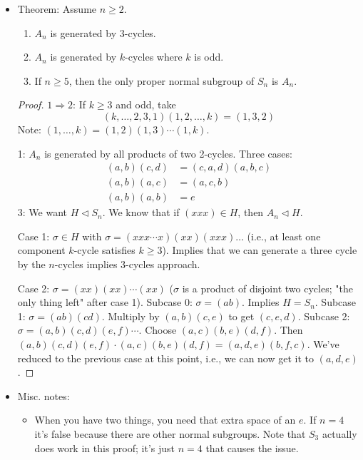 \documentclass[../notes.tex]{subfiles}
\begin{document}
\begin{itemize}
\begin{itemize}
    \end{itemize}
    \item Theorem: Assume $n\geq 2$.
    \begin{enumerate}
        \item $A_n$ is generated by 3-cycles.
        \item $A_n$ is generated by $k$-cycles where $k$ is odd.
        \item If $n\geq 5$, then the only proper normal subgroup of $S_n$ is $A_n$.
    \end{enumerate}
    \begin{proof}
        $1\Rightarrow 2$: If $k\geq 3$ and odd, take
        \begin{equation*}
            (k,\dots,2,3,1)(1,2,\dots,k) = (1,3,2)
        \end{equation*}
        Note: $(1,\dots,k)=(1,2)(1,3)\cdots(1,k)$.\par
        1: $A_n$ is generated by all products of two 2-cycles. Three cases:
        \begin{align*}
            (a,b)(c,d) &= (c,a,d)(a,b,c)\\
            (a,b)(a,c) &= (a,c,b)\\
            (a,b)(a,b) &= e
        \end{align*}
        3: We want $H\triangleleft S_n$. We know that if $(xxx)\in H$, then $A_n\triangleleft H$.\par
        Case 1: $\sigma\in H$ with $\sigma=(xxx\cdots x)(xx)(xxx)\dots$ (i.e., at least one component $k$-cycle satisfies $k\geq 3$). Implies that we can generate a three cycle by the $n$-cycles implies 3-cycles approach.\par
        Case 2: $\sigma=(xx)(xx)\cdots(xx)$ ($\sigma$ is a product of disjoint two cycles; "the only thing left" after case 1). Subcase 0: $\sigma=(ab)$. Implies $H=S_n$. Subcase 1: $\sigma=(ab)(cd)$. Multiply by $(a,b)(c,e)$ to get $(c,e,d)$. Subcase 2: $\sigma=(a,b)(c,d)(e,f)\cdots$. Choose $(a,c)(b,e)(d,f)$. Then $(a,b)(c,d)(e,f)\cdot(a,c)(b,e)(d,f)=(a,d,e)(b,f,c)$. We've reduced to the previous case at this point, i.e., we can now get it to $(a,d,e)$.
    \end{proof}
    \item Misc. notes:
    \begin{itemize}
        \item When you have two things, you need that extra space of an $e$. If $n=4$ it's false because there are other normal subgroups. Note that $S_3$ actually does work in this proof; it's just $n=4$ that causes the issue.

\end{itemize}
\end{itemize}
\end{document}
